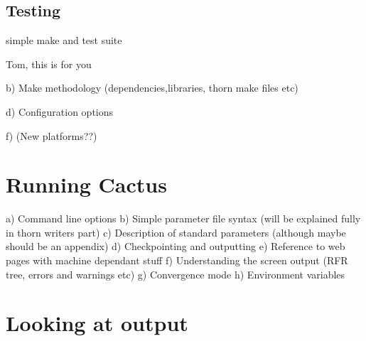
\section{Testing} 

simple make and test suite





{\q Tom, this is for you}

        b) Make methodology (dependencies,libraries, thorn make files
        etc)

      d) Configuration options

      f) (New platforms??)


\chapter{Running Cactus}

      a) Command line options
      b) Simple parameter file syntax (will be explained fully in thorn
         writers part)
      c) Description of standard parameters (although maybe should be an
         appendix)
      d) Checkpointing and outputting
      e) Reference to web pages with machine dependant stuff
      f) Understanding the screen output (RFR tree, errors and warnings etc)
      g) Convergence mode
      h) Environment variables


\chapter{Looking at output}



